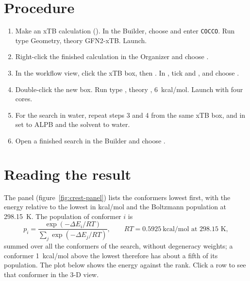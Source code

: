 \section{Procedure}

\begin{enumerate}
	\item Make an xTB calculation (). In the Builder, choose  and enter \texttt{COCCO}. Run type Geometry, theory GFN2-xTB. Launch.
	\item Right-click the finished calculation in the Organizer and choose .
	\item In the workflow view, click the xTB box, then . In , tick  and , and choose .
	\item Double-click the new box. Run type , theory ,  6~kcal/mol. Launch with four cores.
	\item For the search in water, repeat steps 3 and 4 from the same xTB box, and in  set  to ALPB and the solvent to water.
	\item Open a finished search in the Builder and choose .
\end{enumerate}

\section{Reading the result}

The  panel (figure~\ref{fig:crest-panel}) lists the conformers lowest first, with the energy relative to the lowest in kcal/mol and the Boltzmann population at 298.15~K. The population of conformer $i$ is
\begin{equation*}
	p_i = \frac{\exp(-\Delta E_i/RT)}{\sum_j \exp(-\Delta E_j/RT)}, \qquad RT = 0.5925~\text{kcal/mol at 298.15~K},
\end{equation*}
summed over all the conformers of the search, without degeneracy weights; a conformer 1~kcal/mol above the lowest therefore has about a fifth of its population. The plot below shows the energy against the rank. Click a row to see that conformer in the 3-D view.

